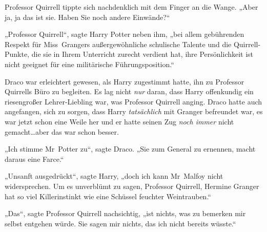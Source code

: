 Professor Quirrell tippte sich nachdenklich mit dem Finger an die Wange. „Aber ja, ja das ist sie. Haben Sie noch andere Einwände?“

„Professor Quirrell“, sagte Harry Potter neben ihm, „bei allem gebührenden Respekt für Miss~Grangers außergewöhnliche schulische Talente und die Quirrell-Punkte, die sie in Ihrem Unterricht zurecht verdient hat, ihre Persönlichkeit ist nicht geeignet für eine militärische Führungsposition.“

Draco war erleichtert gewesen, als Harry zugestimmt hatte, ihn zu Professor Quirrells Büro zu begleiten. Es lag nicht \emph{nur} daran, dass Harry offenkundig ein riesengroßer Lehrer-Liebling war, was Professor Quirrell anging. Draco hatte auch angefangen, sich zu sorgen, dass Harry \emph{tatsächlich} mit Granger befreundet war, es war jetzt schon eine Weile her und er hatte seinen Zug \emph{noch immer} nicht gemacht…aber das war schon besser.

„Ich stimme Mr~Potter zu“, sagte Draco. „Sie zum General zu ernennen, macht daraus eine Farce.“

„Unsanft ausgedrückt“, sagte Harry, „doch ich kann Mr~Malfoy nicht widersprechen. Um es unverblümt zu sagen, Professor Quirrell, Hermine Granger hat so viel Killerinstinkt wie eine Schüssel feuchter Weintrauben.“

„Das“, sagte Professor Quirrell nachsichtig, „ist nichts, was zu bemerken mir selbst entgehen würde. Sie sagen mir nichts, das ich nicht bereits wüsste.“

